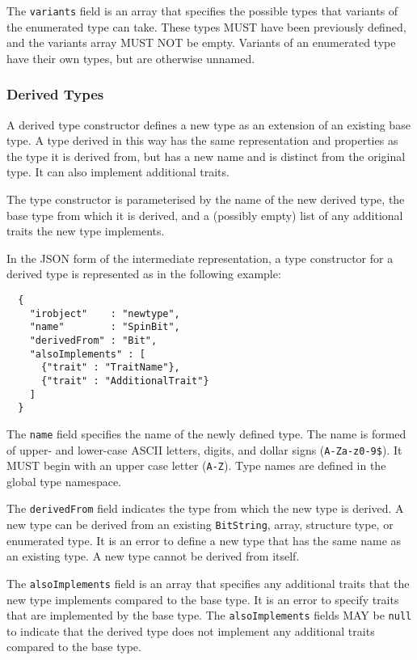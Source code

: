 \documentclass[10pt,twocolumn,a4paper]{article}
\newcommand{\code}[1]{\texttt{#1}}
\begin{document}
The \code{variants} field is an array that specifies the possible types
that variants of the enumerated type can take. These types MUST have been
previously defined, and the variants array MUST NOT be empty. Variants of
an enumerated type have their own types, but are otherwise unnamed.

\subsubsection{Derived Types}

A derived type constructor defines a new type as an extension of an existing
base type. A type derived in this way has the same representation and properties
as the type it is derived from, but has a new name and is distinct from the
original type. It can also implement additional traits.

The type constructor is parameterised by the name of the new derived type,
the base type from which it is derived, and a (possibly empty) list of any
additional traits the new type implements.

In the JSON form of the intermediate representation, a type constructor for
a derived type is represented as in the following example:
\footnotesize
\begin{verbatim}
  {
    "irobject"    : "newtype",
    "name"        : "SpinBit",
    "derivedFrom" : "Bit",
    "alsoImplements" : [
      {"trait" : "TraitName"},
      {"trait" : "AdditionalTrait"}
    ]
  }
\end{verbatim}
\normalsize
The \code{name} field specifies the name of the newly defined type. The
name is formed of upper- and lower-case ASCII letters, digits, and dollar
signs (\code{A-Za-z0-9\$}).  It MUST begin with an upper case letter
(\code{A-Z}). Type names are defined in the global type namespace.

The \code{derivedFrom} field indicates the type from which the new type is
derived.  A new type can be derived from an existing \code{BitString},
array, structure type, or enumerated type. It is an error to define a new
type that has the same name as an existing type. A new type cannot be
derived from itself.

The \code{alsoImplements} field is an array that specifies any additional
traits that the new type implements compared to the base type. It is an
error to specify traits that are implemented by the base type.
The \code{alsoImplements} fields MAY be \code{null} to indicate that the
derived type does not implement any additional traits compared to the base
type.
\end{document}

